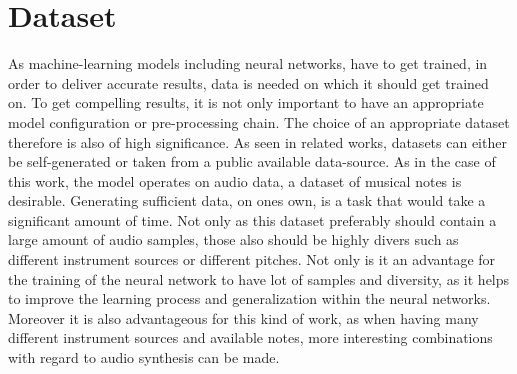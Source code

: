 \section{Dataset}
\label{sec:app_dataset}
As machine-learning models including neural networks, have to get trained, in order to deliver accurate results, data is needed on which it should get trained on. To get compelling results, it is not only important to have an appropriate model configuration or pre-processing chain. The choice of an appropriate dataset therefore is also of high significance. As seen in related works, datasets can either be self-generated or taken from a public available data-source. As in the case of this work, the model operates on audio data, a dataset of musical notes is desirable. Generating sufficient data, on ones own, is a task that would take a significant amount of time. Not only as this dataset preferably should contain a large amount of audio samples, those also should be highly divers such as different instrument sources or different pitches. Not only is it an advantage for the training of the neural network to have lot of samples and diversity, as it helps to improve the learning process and generalization within the neural networks. Moreover it is also advantageous for this kind of work, as when having many different instrument sources and available notes, more interesting combinations with regard to audio synthesis can be made.

